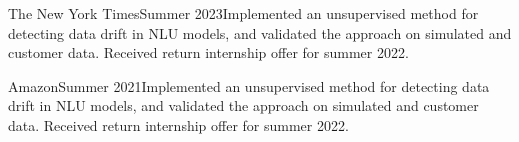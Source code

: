   {The New York Times}{Summer 2023}{}{Implemented an unsupervised method for detecting data drift in NLU models, and validated the approach on simulated and customer data. Received return internship offer for summer 2022.}


  {Amazon}{Summer 2021}{}{Implemented an unsupervised method for detecting data drift in NLU models, and validated the approach on simulated and customer data. Received return internship offer for summer 2022.}
